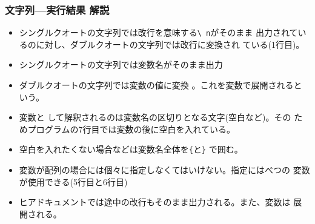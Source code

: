 \documentclass[dvipsk]{beamer}
\begin{document}
\begin{frame}[containsverbatim]
\frametitle{文字列---実行結果 解説}
\begin{itemize}
 \item シングルクオートの文字列では改行を意味する\texttt{\textbackslash
       n}がそのまま
       出力されているのに対し、ダブルクオートの文字列では改行に変換され
       ている(1行目)。
 \item シングルクオートの文字列では変数名がそのまま出力
 \item ダブルクオートの文字列では変数の値に変換
       。これを変数で展開されるという。
\item 変数と
       して解釈されるのは変数名の区切りとなる文字(空白など)。その
       ためプログラムの7行目では変数の後に空白を入れている。
 \item 空白を入れたくない場合などは変数名全体を\texttt{\{}と\texttt{\}}
       で囲む。
 \item 変数が配列の場合には個々に指定しなくてはいけない。指定にはべつの
       変数が使用できる(5行目と6行目)
 \item ヒアドキュメントでは途中の改行もそのまま出力される。また、変数は
       展開される。
\end{itemize}
\end{frame}
\end{document}
